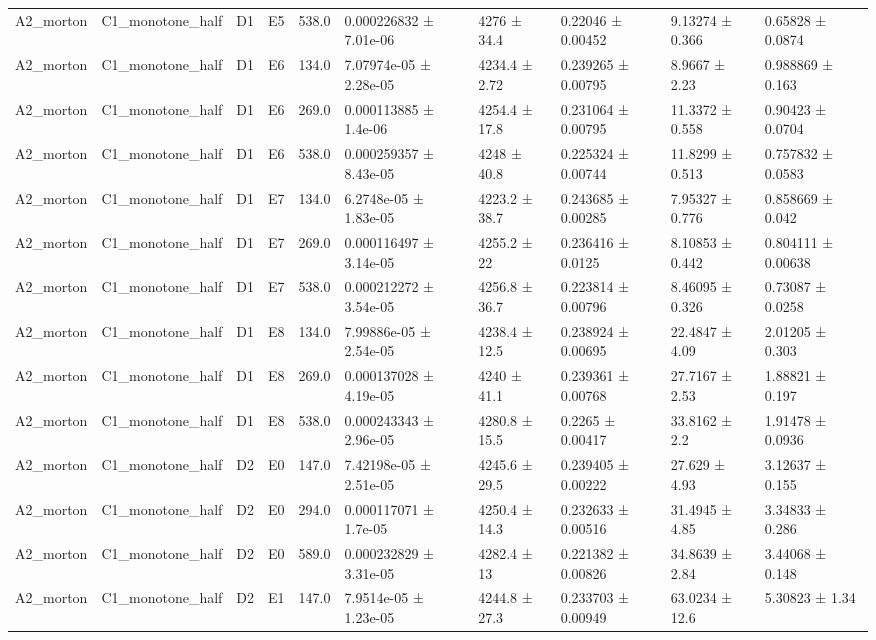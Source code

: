 \begin{table}
\begin{tabular}{llllllllll}
A2\_morton & C1\_monotone\_half & D1 & E5 & 538.0 & 0.000226832 ± 7.01e-06 & 4276 ± 34.4 & 0.22046 ± 0.00452 & 9.13274 ± 0.366 & 0.65828 ± 0.0874 \\
A2\_morton & C1\_monotone\_half & D1 & E6 & 134.0 & 7.07974e-05 ± 2.28e-05 & 4234.4 ± 2.72 & 0.239265 ± 0.00795 & 8.9667 ± 2.23 & 0.988869 ± 0.163 \\
A2\_morton & C1\_monotone\_half & D1 & E6 & 269.0 & 0.000113885 ± 1.4e-06 & 4254.4 ± 17.8 & 0.231064 ± 0.00795 & 11.3372 ± 0.558 & 0.90423 ± 0.0704 \\
A2\_morton & C1\_monotone\_half & D1 & E6 & 538.0 & 0.000259357 ± 8.43e-05 & 4248 ± 40.8 & 0.225324 ± 0.00744 & 11.8299 ± 0.513 & 0.757832 ± 0.0583 \\
A2\_morton & C1\_monotone\_half & D1 & E7 & 134.0 & 6.2748e-05 ± 1.83e-05 & 4223.2 ± 38.7 & 0.243685 ± 0.00285 & 7.95327 ± 0.776 & 0.858669 ± 0.042 \\
A2\_morton & C1\_monotone\_half & D1 & E7 & 269.0 & 0.000116497 ± 3.14e-05 & 4255.2 ± 22 & 0.236416 ± 0.0125 & 8.10853 ± 0.442 & 0.804111 ± 0.00638 \\
A2\_morton & C1\_monotone\_half & D1 & E7 & 538.0 & 0.000212272 ± 3.54e-05 & 4256.8 ± 36.7 & 0.223814 ± 0.00796 & 8.46095 ± 0.326 & 0.73087 ± 0.0258 \\
A2\_morton & C1\_monotone\_half & D1 & E8 & 134.0 & 7.99886e-05 ± 2.54e-05 & 4238.4 ± 12.5 & 0.238924 ± 0.00695 & 22.4847 ± 4.09 & 2.01205 ± 0.303 \\
A2\_morton & C1\_monotone\_half & D1 & E8 & 269.0 & 0.000137028 ± 4.19e-05 & 4240 ± 41.1 & 0.239361 ± 0.00768 & 27.7167 ± 2.53 & 1.88821 ± 0.197 \\
A2\_morton & C1\_monotone\_half & D1 & E8 & 538.0 & 0.000243343 ± 2.96e-05 & 4280.8 ± 15.5 & 0.2265 ± 0.00417 & 33.8162 ± 2.2 & 1.91478 ± 0.0936 \\
A2\_morton & C1\_monotone\_half & D2 & E0 & 147.0 & 7.42198e-05 ± 2.51e-05 & 4245.6 ± 29.5 & 0.239405 ± 0.00222 & 27.629 ± 4.93 & 3.12637 ± 0.155 \\
A2\_morton & C1\_monotone\_half & D2 & E0 & 294.0 & 0.000117071 ± 1.7e-05 & 4250.4 ± 14.3 & 0.232633 ± 0.00516 & 31.4945 ± 4.85 & 3.34833 ± 0.286 \\
A2\_morton & C1\_monotone\_half & D2 & E0 & 589.0 & 0.000232829 ± 3.31e-05 & 4282.4 ± 13 & 0.221382 ± 0.00826 & 34.8639 ± 2.84 & 3.44068 ± 0.148 \\
A2\_morton & C1\_monotone\_half & D2 & E1 & 147.0 & 7.9514e-05 ± 1.23e-05 & 4244.8 ± 27.3 & 0.233703 ± 0.00949 & 63.0234 ± 12.6 & 5.30823 ± 1.34 \\

\end{tabular}
\end{table}
